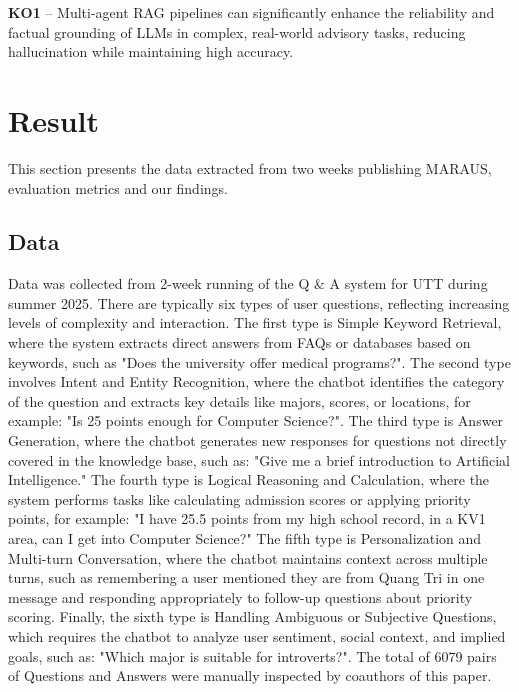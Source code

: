 \documentclass[runningheads]{llncs}
\begin{document}
\begin{tcolorbox}[title=Key Observations,colback=gray!5,colframe=black!75,boxrule=0.8pt]
\textbf{KO1} – Multi-agent RAG pipelines can significantly enhance the reliability and factual grounding of LLMs in complex, real-world advisory tasks, reducing hallucination while maintaining high accuracy.
\end{tcolorbox}

\section{Result}
\label{sec:case-eval}
This section presents the data extracted from two weeks publishing MARAUS, evaluation metrics and our findings.
\subsection{Data}
Data was collected from 2-week running of the Q \& A system for UTT during summer 2025. There are typically six types of user questions, reflecting increasing levels of complexity and interaction. The first type is Simple Keyword Retrieval, where the system extracts direct answers from FAQs or databases based on keywords, such as "Does the university offer medical programs?". The second type involves Intent and Entity Recognition, where the chatbot identifies the category of the question and extracts key details like majors, scores, or locations, for example: "Is 25 points enough for Computer Science?". The third type is Answer Generation, where the chatbot generates new responses for questions not directly covered in the knowledge base, such as: "Give me a brief introduction to Artificial Intelligence." The fourth type is Logical Reasoning and Calculation, where the system performs tasks like calculating admission scores or applying priority points, for example: "I have 25.5 points from my high school record, in a KV1 area, can I get into Computer Science?" The fifth type is Personalization and Multi-turn Conversation, where the chatbot maintains context across multiple turns, such as remembering a user mentioned they are from Quang Tri in one message and responding appropriately to follow-up questions about priority scoring. Finally, the sixth type is Handling Ambiguous or Subjective Questions, which requires the chatbot to analyze user sentiment, social context, and implied goals, such as: "Which major is suitable for introverts?". The total of 6079 pairs of Questions and Answers were manually inspected by coauthors of this paper. 
 
\end{document}
